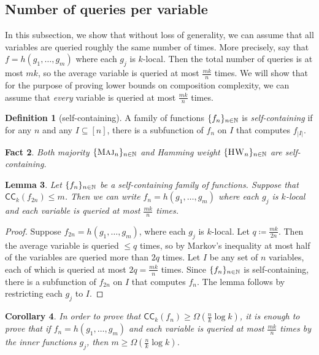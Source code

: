 \documentclass[10pt,a4paper]{article}
\newtheorem{lemma}{Lemma}[section]
\newtheorem{corollary}[lemma]{Corollary}
\newtheorem{fact}[lemma]{Fact}
\theoremstyle{definition}
\newtheorem{definition}[lemma]{Definition}
\theoremstyle{remark}
\newcommand{\mathsc}[1]{{\normalfont\textsc{#1}}}
\DeclarePairedDelimiter{\set}{\{}{\}}
\newcommand{\N}{\mathbb{N}}
\DeclareMathOperator{\Maj}{\mathsc{Maj}}
\DeclareMathOperator{\HW}{\mathsc{HW}}
\newcommand{\CC}{\mathsf{CC}}
\begin{document}
\subsection{Number of queries per variable}
In this subsection, we show that without loss of generality, we can assume that all variables are queried roughly the same number of times.
More precisely, say that $f = h(g_1, \ldots, g_m)$ where each $g_j$ is $k$-local.
Then the total number of queries is at most $mk$, so the average variable is queried at most $\frac{mk}{n}$ times.
We will show that for the purpose of proving lower bounds on composition complexity, we can assume that \emph{every} variable is queried at most $\frac{mk}{n}$ times.

\begin{definition}[self-containing]
A family of functions $\set{f_n}_{n \in \N}$ is \emph{self-containing} if for any $n$ and any $I \subseteq [n]$, there is a subfunction of $f_n$ on $I$ that computes $f_{|I|}$.
\end{definition}

\begin{fact}
Both majority $\set{\Maj_n}_{n \in \N}$ and Hamming weight $\set{\HW_n}_{n \in \N}$ are self-containing.%
\end{fact}


\begin{lemma}
\label{lemma:wlog}
Let $\set{f_n}_{n \in \N}$ be a self-containing family of functions.
Suppose that $\CC_k(f_{2n}) \leq m$.
Then we can write $f_n = h(g_1, \ldots, g_m)$ where each $g_j$ is $k$-local and each variable is queried at most $\frac{mk}{n}$ times.
\end{lemma}

\begin{proof}
Suppose $f_{2n} = h(g_1, \ldots, g_m)$, where each $g_j$ is $k$-local.
Let $q \coloneqq \frac{mk}{2n}$.
Then the average variable is queried $\leq q$ times, so by Markov's inequality at most half of the variables are queried more than $2q$ times.
Let $I$ be any set of $n$ variables, each of which is queried at most $2q = \frac{mk}{n}$ times.
Since $\set{f_n}_{n \in \N}$ is self-containing, there is a subfunction of $f_{2n}$ on $I$ that computes $f_n$.
The lemma follows by restricting each $g_j$ to $I$.
\end{proof}

\begin{corollary}
\label{cor:wlog}
In order to prove that $\CC_k(f_n) \geq \Omega(\frac{n}{k} \log k)$, it is enough to prove that if $f_n = h(g_1, \ldots, g_m)$ and each variable is queried at most $\frac{mk}{n}$ times by the inner functions $g_j$, then $m \geq \Omega(\frac{n}{k} \log k)$.
\end{corollary}
\end{document}
